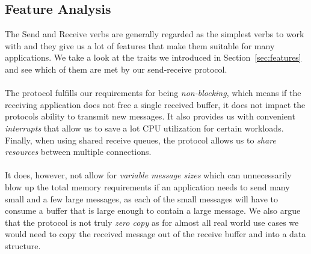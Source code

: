 \subsection{Feature Analysis}

The Send and Receive verbs are generally regarded as the simplest verbs to work with and they give us a lot of features
that make them suitable for many applications. We take a look at the traits we introduced in Section~\ref{sec:features} 
and see which of them are met by our send-receive protocol.

\paragraph{} The protocol fulfills our requirements for being \emph{non-blocking}, which means if the receiving application does not free a single
received buffer, it does not impact the protocols ability to transmit new messages.
It also provides us with convenient \emph{interrupts} that allow us to save a lot CPU utilization for certain workloads.
Finally, when using shared receive queues, the protocol allows us to \emph{share resources} between multiple connections.

\paragraph{} It does, however, not allow for \emph{variable message sizes} which can unnecessarily blow up the total memory
requirements if an application needs to send many small and a few large messages, as each of the small messages will have
to consume a buffer that is large enough to contain a large message. We also argue that the protocol is not truly 
\emph{zero copy} as for almost all real world use cases we would need to copy the received message out of the
receive buffer and into a data structure.

